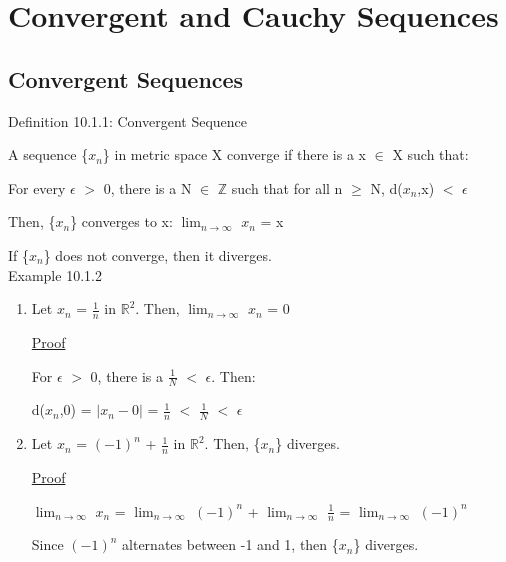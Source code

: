 \newpage

\section[Day 10: Convergence \& Cauchy Sequences]{Convergent and Cauchy Sequences}

\subsection{Convergent Sequences}

{ \color{blue} Definition 10.1.1: Convergent Sequence } 

    \begin{adjustbox}{minipage=14cm, right, vspace=0.1cm 0cm}
        A sequence \{$x_n$\} in metric space X converge if
        there is a x $\in$ X such that:

        \hspace{1cm}
        For every $\epsilon$ $>$ 0, there is a N $\in$ $\mathbb{Z}$ such that
        for all n $\geq$ N, d($x_n$,x) $<$ $\epsilon$
        
        Then, \{$x_n$\} converges to x: \hspace{1cm}
        $\lim_{n \rightarrow \infty}$ $x_n$ = x

        If \{$x_n$\} does not converge, then it diverges. \\
	\end{adjustbox}

{ \color{purple} Example 10.1.2 }

    \begin{enumerate}[label=(\alph*), leftmargin=2cm, itemsep=0.4em]
        \item Let $x_n$ = $\frac{1}{n}$ in $\mathbb{R}^2$.
        Then, $\lim_{n \rightarrow \infty}$ $x_n$ = 0

            { \color{magenta} \underline{Proof} }

                For $\epsilon$ $>$ 0, there is a $\frac{1}{N}$ $<$ $\epsilon$.
                Then:

                \hspace{1cm}
                d($x_n$,0) = $|x_n - 0|$ = $\frac{1}{n}$
                $<$ $\frac{1}{N}$ $<$ $\epsilon$

        \item Let $x_n$ = $(-1)^n$ + $\frac{1}{n}$ in $\mathbb{R}^2$.
        Then, \{$x_n$\} diverges.

            { \color{magenta} \underline{Proof} }

                $\lim_{n \rightarrow \infty}$ $x_n$
                = $\lim_{n \rightarrow \infty}$ $(-1)^n$
                + $\lim_{n \rightarrow \infty}$ $\frac{1}{n}$
                = $\lim_{n \rightarrow \infty}$ $(-1)^n$

                Since $(-1)^n$ alternates between -1 and 1, then
                \{$x_n$\} diverges. \\
    \end{enumerate}


